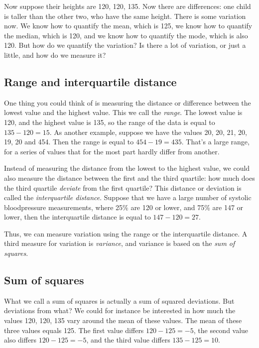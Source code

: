 \documentclass[]{book}\usepackage[]{graphicx}\usepackage[]{color}
\begin{document}
Now suppose their heights are 120, 120, 135. Now there are differences: one child is taller than the other two, who have the same height. There is some variation now. We know how to quantify the mean, which is 125, we know how to quantify the median, which is 120, and we know how to quantify the mode, which is also 120. But how do we quantify the variation? Is there a lot of variation, or just a little, and how do we measure it?

\subsection{Range and interquartile distance}

One thing you could think of is measuring the distance or difference between the lowest value and the highest value. This we call the \textit{range}. The lowest value is 120, and the highest value is 135, so the range of the data is equal to $135-120=15$. As another example, suppose we have the values 20, 20, 21, 20, 19, 20 and 454. Then the range is equal to $454-19=435$. That's a large range, for a series of values that for the most part hardly differ from another.

Instead of measuring the distance from the lowest to the highest value, we could also measure the distance between the first and the third quartile: how much does the third quartile \textit{deviate} from the first quartile? This distance or deviation is called the \textit{interquartile distance}. Suppose that we have a large number of systolic bloodpressure measurements, where 25\% are 120 or lower, and 75\% are 147 or lower, then the interquartile distance is equal to $147-120=27$.

Thus, we can measure variation using the range or the interquartile distance. A third measure for variation is \textit{variance}, and variance is based on the \textit{sum of squares}.

\subsection{Sum of squares}

What we call a sum of squares is actually a sum of squared deviations. But deviations from what? We could for instance be interested in how much the values 120, 120, 135 vary around the mean of these values. The mean of these three values equals 125. The first value differs $120-125= -5$, the second value also differs $120-125= -5$, and the third value differs $135-125= 10$.
\end{document}
